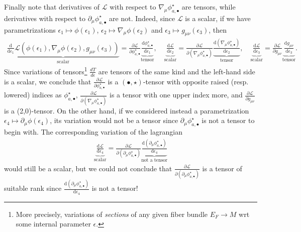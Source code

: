 \documentclass[../geometry_main.tex]{subfiles}
\begin{document}
\begin{mytheorem}
Finally note that derivatives of $\mathcal{L}$ with respect to $\nabla_\mu \phi^\star_{a,\bullet}$ are tensors, while derivatives with respect to $\partial_\mu \phi^\star_{a,\bullet}$ are not.
Indeed, since $\mathcal{L}$ is a scalar, if we have parametrizations $\epsilon_1 \mapsto \phi(\epsilon_1)$, $\epsilon_2 \mapsto \nabla_\mu \phi(\epsilon_2)$ and $\epsilon_3\mapsto g_{\mu\nu}(\epsilon_3)$, then
{\small   
\begin{align}
    \underbrace{\frac{\mathrm{d}}{\mathrm{d}\epsilon_1} \mathcal{L}(\phi(\epsilon_1), \nabla_\mu \phi(\epsilon_2), g_{\mu\nu}(\epsilon_3))}_{\mathrm{scalar}}
    = \frac{\partial \mathcal{L}}{\partial \phi^\star_{a,\bullet}} \underbrace{\frac{\mathrm{d}\phi^\star_{a,\bullet}}{\mathrm{d}\epsilon_1}}_{\mathrm{tensor}},
    \quad
    \underbrace{\frac{\mathrm{d}\mathcal{L}}{\mathrm{d}\epsilon_2}}_{\mathrm{scalar}}=\frac{\partial \mathcal{L}}{\partial (\nabla_\mu \phi^\star_{a,\bullet})} \underbrace{\frac{\mathrm{d}(\nabla_\mu \phi^\star_{a,\bullet})}{\mathrm{d}\epsilon_2}}_{\mathrm{tensor}},
    \quad 
    \underbrace{\frac{\mathrm{d}\mathcal{L}}{\mathrm{d}\epsilon_3}}_{\mathrm{scalar}} =\frac{\partial \mathcal{L}}{\partial g_{\mu\nu}} \underbrace{\frac{\mathrm{d}g_{\mu\nu}}{\mathrm{d}\epsilon_3}}_{\mathrm{tensor}}.
\end{align}
}
Since variations of tensors\footnote{More precisely, variations of \emph{sections} of any given fiber bundle $E_F\to M$ wrt some internal parameter $\epsilon$.} $\frac{d T}{d\epsilon}$ are tensors of the same kind and the left-hand side is a scalar, we conclude that $\frac{\partial \mathcal{L}}{\partial \phi^\star_{a,\bullet}}$ is a $(\bullet,\star)$-tensor with opposite raised (resp. lowered) indices as $\phi^\star_{a,\bullet}$, $\frac{\partial \mathcal{L}}{\partial (\nabla_\mu \phi^\star_{a,\bullet})}$ is a tensor with one upper index more, and $\frac{\partial \mathcal{L}}{\partial g_{\mu\nu}}$ is a (2,0)-tensor.
On the other hand, if we considered instead  a parametrization $\epsilon_4 \mapsto \partial_\mu \phi(\epsilon_4)$, its variation would not be a tensor since $\partial_\mu \phi^\star_{a,\bullet}$ is not a tensor to begin with.
The corresponding variation of the lagrangian
{\small
\begin{align}
    \underbrace{\frac{\mathrm{d}\mathcal{L}}{\mathrm{d}\epsilon_4}}_{\mathrm{scalar}}=
    \frac{\partial \mathcal{L}}{\partial (\partial_\mu \phi^\star_{a,\bullet})} \underbrace{\frac{\mathrm{d}(\partial_\mu \phi^\star_{a,\bullet})}{\mathrm{d}\epsilon_4}}_{\text{not a tensor}}
\end{align}
}
would still be a scalar, but we could not conclude that $\frac{\partial \mathcal{L}}{\partial (\partial_\mu \phi^\star_{a,\bullet})}$ is a tensor of suitable rank since $\frac{\mathrm{d}(\partial_\mu \phi^\star_{a,\bullet})}{\mathrm{d}\epsilon_4}$ is not a tensor!


\end{mytheorem}
\end{document}
